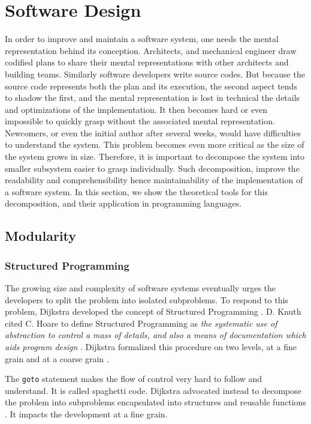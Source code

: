 \section{Software Design} \label{chapter3:software-design}

In order to improve and maintain a software system, one needs the mental representation behind its conception.
Architects, and mechanical engineer draw codified plans to share their mental representations with other architects and building teams.
Similarly software developers write source codes.
But because the source code represents both the plan and its execution, the second aspect tends to shadow the first, and the mental representation is lost in technical the details and optimizations of the implementation.
It then becomes hard or even impossible to quickly grasp without the associated mental representation.
Newcomers, or even the initial author after several weeks, would have difficulties to understand the system.
This problem becomes even more critical as the size of the system grows in size.
Therefore, it is important to decompose the system into smaller subsystem easier to grasp individually.
Such decomposition, improve the readability and comprehensibility hence maintainability of the implementation of a software system.
In this section, we show the theoretical tools for this decomposition, and their application in programming languages.

\subsection{Modularity}

\subsubsection{Structured Programming}

The growing size and complexity of software systems eventually urges the developers to split the problem into isolated subproblems.
To respond to this problem, Dijkstra developed the concept of Structured Programming \cite{Dijkstra1970}.
D. Knuth cited C. Hoare to define Structured Programming as \textit{the systematic use of abstraction to control a mass of details, and also a means of documentation which aids program design} \cite{Knuth1974}.
Dijkstra formalized this procedure on two levels, at a fine grain and at a coarse grain \cite{Dijkstra1968a,Dijkstra1968}.

The \texttt{goto} statement makes the flow of control very hard to follow and understand.
It is called spaghetti code.
Dijkstra advocated instead to decompose the problem into subproblems encapsulated into  structures and reusable functions \cite{Dijkstra1968a}.
It impacts the development at a fine grain.

